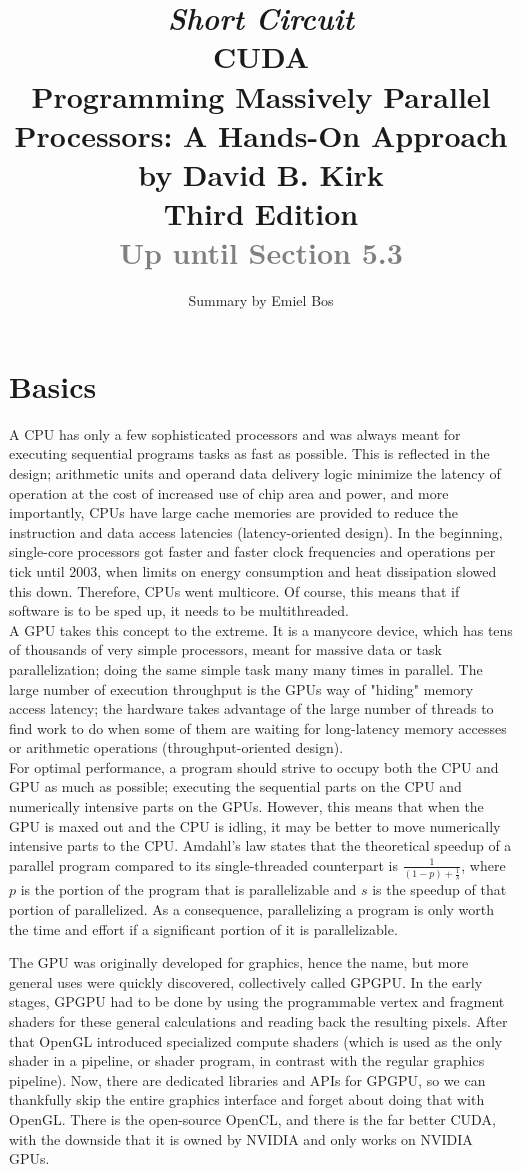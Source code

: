 \documentclass[8pt, table, xcdraw]{article}%
\title{
\textit{Short Circuit}\\
\vspace{20px}
\huge
CUDA\\
\vspace{25px}
\large
Programming Massively Parallel Processors: A Hands-On Approach\\
by David B. Kirk\\
Third Edition\\
\textcolor{gray}{Up until Section 5.3}
}
\author{Summary by Emiel Bos}
\date{}
\begin{document}
\maketitle

\section{Basics}

A CPU has only a few sophisticated processors and was always meant for executing sequential programs tasks as fast as possible. This is reflected in the design; arithmetic units and operand data delivery logic minimize the latency of operation at the cost of increased use of chip area and power, and more importantly, CPUs have large cache memories are provided to reduce the instruction and data access latencies (latency-oriented design). In the beginning, single-core processors got faster and faster clock frequencies and operations per tick until 2003, when limits on energy consumption and heat dissipation slowed this down. Therefore, CPUs went multicore. Of course, this means that if software is to be sped up, it needs to be multithreaded.\\
A GPU takes this concept to the extreme. It is a manycore device, which has tens of thousands of very simple processors, meant for massive data or task parallelization; doing the same simple task many many times in parallel. The large number of execution throughput is the GPUs way of "hiding" memory access latency; the hardware takes advantage of the large number of threads to find work to do when some of them are waiting for long-latency memory accesses or arithmetic operations (throughput-oriented design).\\
For optimal performance, a program should strive to occupy both the CPU and GPU as much as possible; executing the sequential parts on the CPU and numerically intensive parts on the GPUs. However, this means that when the GPU is maxed out and the CPU is idling, it may be better to move numerically intensive parts to the CPU. Amdahl's law states that the theoretical speedup of a parallel program compared to its single-threaded counterpart is $\frac{1}{(1-p) + \frac{1}{s}}$, where $p$ is the portion of the program that is parallelizable and $s$ is the speedup of that portion of parallelized. As a consequence, parallelizing a program is only worth the time and effort if a significant portion of it is parallelizable.

The GPU was originally developed for graphics, hence the name, but more general uses were quickly discovered, collectively called GPGPU. In the early stages, GPGPU had to be done by using the programmable vertex and fragment shaders for these general calculations and reading back the resulting pixels. After that OpenGL introduced specialized compute shaders (which is used as the only shader in a pipeline, or shader program, in contrast with the regular graphics pipeline). Now, there are dedicated libraries and APIs for GPGPU, so we can thankfully skip the entire graphics interface and forget about doing that with OpenGL. There is the open-source OpenCL, and there is the far better CUDA, with the downside that it is owned by NVIDIA and only works on NVIDIA GPUs.
\end{document}
